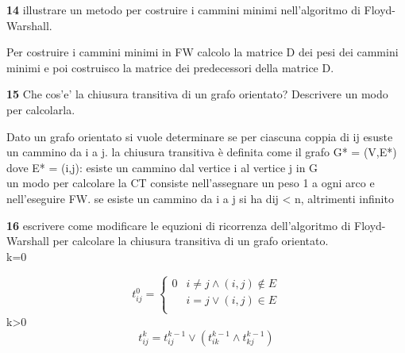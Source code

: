 \documentclass[12pt, a4paper, openany]{book}
\newcommand{\domanda}[2]{\begin{box_domanda}\textbf{#1} #2\end{box_domanda}}
\newcommand{\risposta}[1]{#1}
\begin{document}
\domanda{14}{
illustrare un metodo per costruire i cammini minimi nell’algoritmo di Floyd-Warshall.
}
\risposta{
Per costruire i cammini minimi in FW calcolo la matrice D dei pesi dei cammini minimi e poi costruisco la matrice dei predecessori della matrice D.
}
\domanda{15}{
Che cos’e’ la chiusura transitiva di un grafo orientato? Descrivere un modo
per calcolarla.}
\risposta{
Dato un grafo orientato si vuole determinare se per ciascuna coppia di ij esuste un cammino da i a j. la chiusura transitiva è definita come il grafo G* = (V,E*) dove E* = {(i,j): esiste un cammino dal vertice i al vertice j in G}\\
un modo per calcolare la CT consiste nell'assegnare un peso 1 a ogni arco e nell'eseguire FW. se esiste un cammino da i a j si ha dij < n, altrimenti infinito
}
\domanda{16}{
escrivere come modificare le equzioni di ricorrenza dell’algoritmo di Floyd-Warshall per calcolare la chiusura transitiva di un grafo orientato.\\
k=0
}
\risposta{
\begin{equation*}
	t_{ij}^0 = \begin{cases}
		0  & i \neq j \land (i,j) \notin E \\
		\  & i = j \lor (i,j) \in E        \\
	\end{cases}
\end{equation*}
k>0
\begin{equation*}
	t_{ij}^k = t_{ij}^{k-1} \lor (t_{ik}^{k-1} \land t_{kj}^{k-1})
\end{equation*}
}
\end{document}

